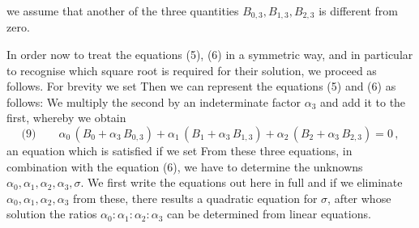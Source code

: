 

we assume that another of the three quantities $B_{0,3}, B_{1,3}, B_{2,3}$
is different from zero.

\indent In order now to treat the equations (5), (6) in a symmetric
way, and in particular to recognise which square root is required
for their solution, we proceed as follows. For brevity we set
Then we can represent the equations (5) and (6) as follows:
We multiply the second by an indeterminate factor
$\alpha_3$ and add it to the first, whereby we obtain
\[
\text{(9)} \qquad \alpha_0\,(B_0 + \alpha_3\,B_{0,3}) + \alpha_1\,(B_1 + \alpha_3\,B_{1,3}) + \alpha_2\,(B_2 + \alpha_3\,B_{2,3}) = 0\,,
\]
an equation which is satisfied if we set
From these three equations, in combination with the equation
(6), we have to determine the unknowns $\alpha_0, \alpha_1, \alpha_2, \alpha_3, \sigma$.
We first write the equations out here in full
and if we eliminate $\alpha_0, \alpha_1, \alpha_2, \alpha_3$ from these, there results
a quadratic equation for $\sigma$, after whose solution the
ratios $\alpha_0 : \alpha_1 : \alpha_2 : \alpha_3$ can be determined from linear equations.

